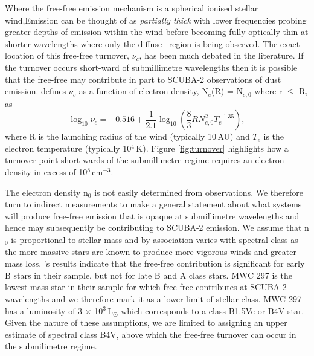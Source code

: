 Where the free-free emission mechanism is a spherical ionised stellar wind,Emission can be thought of as \emph{partially thick} with lower frequencies probing greater depths of emission within the wind before becoming fully optically thin at shorter wavelengths where only the diffuse \HII\ region is being observed. The exact location of this free-free turnover, $\nu_{c}$, has been much debated in the literature. If the turnover occurs short-ward of submillimetre wavelengths then it is possible that the free-free may contribute in part to SCUBA-2 observations of dust emission. \cite{Olnon:1975bh} defines $\nu_{c}$ as a function of electron density, N$_{e}$(R) = N$_{e,0}$ where r $\leq$ R, as 
\begin{equation}
\log_{10} \nu _{c} = - 0.516 + \frac{1}{2.1}\log_{10}\left ( \frac{8}{3}RN_{e,0}^{2}T_{e}^{-1.35} \right ),  
\label{eqn:turnover}
\end{equation}
where R is the launching radius of the wind (typically 10\,AU) and $T_{e}$ is the electron temperature (typically 10$^{4}$\,K). Figure \ref{fig:turnover} highlights how a turnover point short wards of the submillimetre regime requires an electron density in excess of 10$^{8}$\,cm$^{-3}$. 

The electron density n$_{0}$ is not easily determined from observations. We therefore turn to indirect measurements to make a general statement about what systems will produce free-free emission that is opaque at submillimetre wavelengths and hence may subsequently be contributing to SCUBA-2 emission. We assume that n$_{0}$ is proportional to stellar mass and by association varies with spectral class as the more massive stars are known to produce more vigorous winds and greater mass loss. \cite{Sandell:2011dz}'s results indicate that the free-free contribution is significant for early B stars in their sample, but not for late B and A class stars. MWC 297 is the lowest mass star in their sample for which free-free contributes at SCUBA-2 wavelengths and we therefore mark it as a lower limit of stellar class. MWC 297 has a luminosity of 3 $\times$ 10$^{3}$\,L$_{\odot}$ \citep{Drew:1997qf} which corresponds to a class B1.5Ve or B4V star. Given the nature of these assumptions, we are limited to assigning an upper estimate of spectral class B4V, above which the free-free turnover can occur in the submilimetre regime. 

